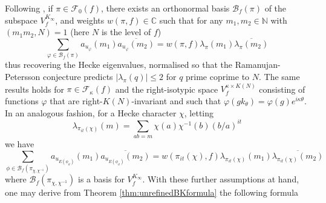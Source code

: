 \documentclass{article}
\numberwithin{equation}{section}
\begin{document}
Following \cite[\S 7]{Petrow_2018}, if $\pi \in \mathcal{F}_0(f)$, there exists an orthonormal basis $\mathcal{B}_f(\pi)$ of the subspace $V_f^{K_\infty}$, and weights $w(\pi,f) \in \mathbb{C}$ such that for any $m_1,m_2 \in \mathbb{N}$ with $(m_1m_2,N)=1$ (here $N$ is the level of $f$)
\begin{equation}\label{def:discrete-weights}
    \sum_{\varphi \in \mathcal{B}_f(\pi)}a_{u_\varphi}(m_1)\overline{a_{u_{\varphi}}(m_2)}= w(\pi,f)\lambda_\pi(m_1)\overline{\lambda_\pi(m_2)}
\end{equation}
thus recovering the Hecke eigenvalues, normalised so that the Ramanujan-Petersson conjecture predicts $|\lambda_\pi(q)|\leq 2$ for $q$ prime coprime to $N$. The same results holds for $\pi \in \mathcal{F}_\kappa(f)$ and the right-isotypic space $V_f^{\kappa\times K(N)}$ consisting of functions $\varphi$ that are right-$K(N)$-invariant and such that $\varphi(gk_\theta)=\varphi(g)e^{i\kappa\theta}$. In an analogous fashion, for a Hecke character $\chi$, letting
\begin{equation}\label{def:cts-Hecke}
    \lambda_{\pi_{it}(\chi)}(m)=\sum_{ab=m}\chi(a)\chi^{-1}(b)(b/a)^{it}
\end{equation}
we have
\begin{equation}\label{def:continuous-weights}
    \sum_{\phi \in \mathcal{B}_f(\pi_{\chi,\chi^{-1}})}a_{u_{E(\phi_{it})}}(m_1)\overline{a_{u_{E(\phi_{it})}}(m_2)}=w(\pi_{it}(\chi),f)\lambda_{\pi_{it}(\chi)}(m_1)\overline{\lambda_{\pi_{it}(\chi)}(m_2)}
\end{equation}
where $\mathcal{B}_f(\pi_{\chi,\chi^{-1}})$ is a basis for $V_f^{K_\infty}$. With these further assumptions at hand, one may derive from Theorem \ref{thm:unrefinedBKformula} the following formula
\end{document}
